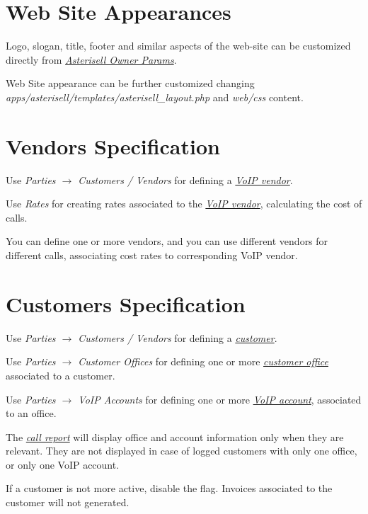 \documentclass[letterpaper,10pt,english]{sphinxmanual}
\begin{document}
\section{Web Site Appearances}
\label{index:web-site-appearances}
Logo, slogan, title, footer and similar aspects of the web-site can be customized directly from {\hyperref[index:asterisell-owner]{\emph{Asterisell Owner Params}}}.

Web Site appearance can be further customized changing \emph{apps/asterisell/templates/asterisell\_layout.php} and \emph{web/css} content.


\section{Vendors Specification}
\label{index:vendors-specification}\label{index:id3}
Use \emph{Parties \(\rightarrow\) Customers / Vendors} for defining a {\hyperref[index:term-voip-vendor]{\emph{VoIP vendor}}}.

Use \emph{Rates} for creating rates associated to the {\hyperref[index:term-voip-vendor]{\emph{VoIP vendor}}}, calculating the cost of calls.

You can define one or more vendors, and you can use different vendors for different calls, associating cost rates to corresponding VoIP vendor.


\section{Customers Specification}
\label{index:customers-specification}
Use \emph{Parties \(\rightarrow\) Customers / Vendors} for defining a {\hyperref[index:term-customer]{\emph{customer}}}.

Use \emph{Parties \(\rightarrow\) Customer Offices} for defining one or more  {\hyperref[index:term-customer-office]{\emph{customer office}}} associated to a customer.

Use \emph{Parties \(\rightarrow\) VoIP Accounts} for defining one or more  {\hyperref[index:term-voip-account]{\emph{VoIP account}}}, associated to an office.

The {\hyperref[index:term-call-report]{\emph{call report}}} will display office and account information only when they are relevant. They are not displayed in case of logged customers with only one office, or only one VoIP account.

If a customer is not more active, disable the  flag. Invoices associated to the customer will not generated.
\end{document}
